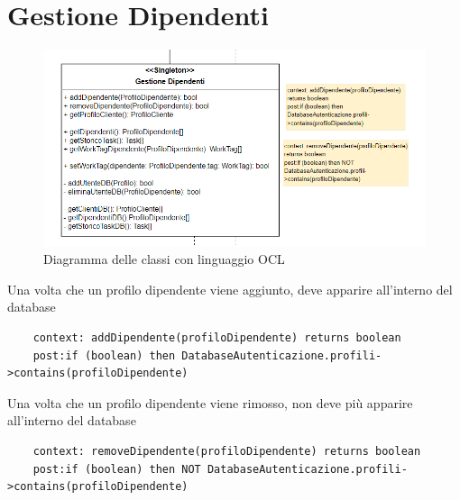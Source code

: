 \documentclass{report}
\begin{document}
\section{Gestione Dipendenti}
\begin{figure}[H]
	\centering\includegraphics[width=1\textwidth]{images/OCL/OCL_Gestione_Dipendenti.PNG}
	Diagramma delle classi con linguaggio OCL 
\end{figure}
Una volta che un profilo dipendente viene aggiunto, deve apparire all'interno del database
\begin{verbatim}
	context: addDipendente(profiloDipendente) returns boolean
	post:if (boolean) then DatabaseAutenticazione.profili->contains(profiloDipendente)
\end{verbatim}
Una volta che un profilo dipendente viene rimosso, non deve più apparire all'interno del database
\begin{verbatim}
	context: removeDipendente(profiloDipendente) returns boolean
	post:if (boolean) then NOT DatabaseAutenticazione.profili->contains(profiloDipendente)

\end{verbatim}
\end{document}
